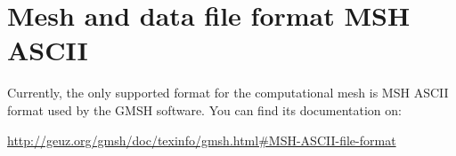 %
%
%
%


\section{Mesh and data file format MSH ASCII}
\label{mesh_file}

Currently, the only supported format for the computational mesh is MSH ASCII format used
by the GMSH software. You can find its documentation on:

\url{http://geuz.org/gmsh/doc/texinfo/gmsh.html#MSH-ASCII-file-format}

